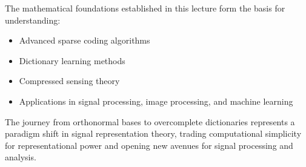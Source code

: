 \documentclass[12pt]{article}
\theoremstyle{definition}
\begin{document}
The mathematical foundations established in this lecture form the basis for understanding:
\begin{itemize}
    \item Advanced sparse coding algorithms
    \item Dictionary learning methods
    \item Compressed sensing theory
    \item Applications in signal processing, image processing, and machine learning
\end{itemize}

The journey from orthonormal bases to overcomplete dictionaries represents a paradigm shift in signal representation theory, trading computational simplicity for representational power and opening new avenues for signal processing and analysis.
\end{document}
